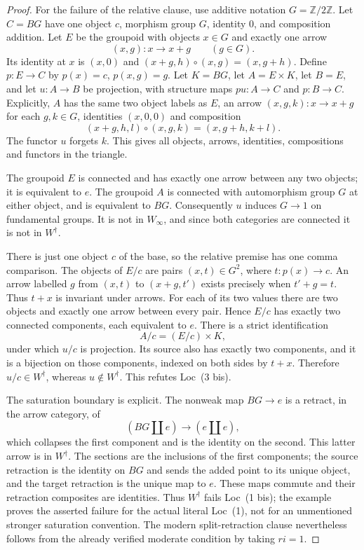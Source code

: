 \begin{proof}
For the failure of the relative clause, use additive notation $G=\mathbb Z/2\mathbb Z$. Let $C=BG$ have one object $c$, morphism group $G$, identity $0$, and composition addition. Let $E$ be the groupoid with objects $x\in G$ and exactly one arrow
\[
 (x,g):x\longrightarrow x+g\qquad(g\in G).
\]
Its identity at $x$ is $(x,0)$ and
$(x+g,h)\circ(x,g)=(x,g+h)$. Define $p:E\to C$ by $p(x)=c$, $p(x,g)=g$. Let $K=BG$, let $A=E\times K$, let $B=E$, and let $u:A\to B$ be projection, with structure maps $pu:A\to C$ and $p:B\to C$. Explicitly, $A$ has the same two object labels as $E$, an arrow $(x,g,k):x\to x+g$ for each $g,k\in G$, identities $(x,0,0)$ and composition
\[
 (x+g,h,l)\circ(x,g,k)=(x,g+h,k+l).
\]
The functor $u$ forgets $k$. This gives all objects, arrows, identities, compositions and functors in the triangle.

The groupoid $E$ is connected and has exactly one arrow between any two objects; it is equivalent to $e$. The groupoid $A$ is connected with automorphism group $G$ at either object, and is equivalent to $BG$. Consequently $u$ induces $G\to1$ on fundamental groups. It is not in $W_\infty$, and since both categories are connected it is not in $W^\dagger$.

There is just one object $c$ of the base, so the relative premise has one comma comparison. The objects of $E/c$ are pairs $(x,t)\in G^2$, where $t:p(x)\to c$. An arrow labelled $g$ from $(x,t)$ to $(x+g,t')$ exists precisely when $t'+g=t$. Thus $t+x$ is invariant under arrows. For each of its two values there are two objects and exactly one arrow between every pair. Hence $E/c$ has exactly two connected components, each equivalent to $e$. There is a strict identification
\[
 A/c=(E/c)\times K,
\]
under which $u/c$ is projection. Its source also has exactly two components, and it is a bijection on those components, indexed on both sides by $t+x$. Therefore $u/c\in W^\dagger$, whereas $u\notin W^\dagger$. This refutes Loc~(3 bis).

The saturation boundary is explicit. The nonweak map $BG\to e$ is a retract, in the arrow category, of
\[
 (BG\amalg e)\longrightarrow(e\amalg e),
\]
which collapses the first component and is the identity on the second. This latter arrow is in $W^\dagger$. The sections are the inclusions of the first components; the source retraction is the identity on $BG$ and sends the added point to its unique object, and the target retraction is the unique map to $e$. These maps commute and their retraction composites are identities. Thus $W^\dagger$ fails Loc~(1 bis); the example proves the asserted failure for the actual literal Loc~(1), not for an unmentioned stronger saturation convention. The modern split-retraction clause nevertheless follows from the already verified moderate condition by taking $ri=1$.


\end{proof}
